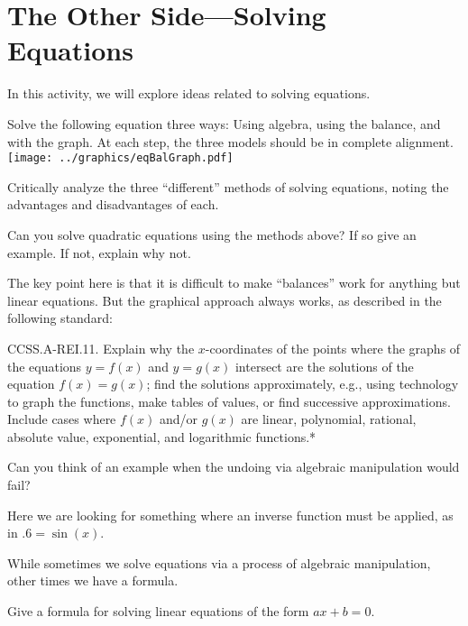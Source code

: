 \newpage
\section{The Other Side---Solving Equations}\label{A:otherSide}


In this activity, we will explore ideas related to solving equations.


\begin{prob}
Solve the following equation three ways: Using algebra, using the
balance, and with the graph. At each step, the three models should be in
complete alignment.
\[
\]\texttt{[image: ../graphics/eqBalGraph.pdf]}
\end{prob}


\begin{prob}
Critically analyze the three ``different'' methods of solving
equations, noting the advantages and disadvantages of each. 
\end{prob}

\begin{prob}
Can you solve quadratic equations using the methods above?
If so give an example. If not, explain why not.
\end{prob}

\begin{teachingnote}
The key point here is that it is difficult to make ``balances'' work for anything but linear equations.  But the graphical approach always works, as described in the following standard:  

CCSS.A-REI.11.  Explain why the $x$-coordinates of the points where the graphs of the equations $y = f(x)$ and $y = g(x)$ intersect are the solutions of the equation $f(x) = g(x)$; find the solutions approximately, e.g., using technology to graph the functions, make tables of values, or find successive approximations. Include cases where $f(x)$ and/or $g(x)$ are linear, polynomial, rational, absolute value, exponential, and logarithmic functions.*
\end{teachingnote}


\begin{prob}
Can you think of an example when the undoing via algebraic
manipulation would fail?
\end{prob}

\begin{teachingnote}
Here we are looking for something where an inverse function must be
applied, as in $.6 = \sin(x)$.
\end{teachingnote}


While sometimes we solve equations via a process of algebraic
manipulation, other times we have a formula.


\begin{prob}
Give a formula for solving linear equations of the form $ax + b =0$.
\end{prob}




